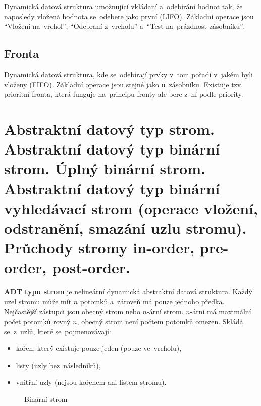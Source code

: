 Dynamická datová struktura umožnující vkládaní a~odebírání hodnot tak, že naposledy vložená hodnota se~odebere jako první (LIFO). Základní operace jsou \enquote{Vložení na~vrchol}, \enquote{Odebraní z~vrcholu} a~\enquote{Test na~prázdnost zásobníku}.

\subsection{Fronta}

Dynamická datová struktura, kde se~odebírají prvky v~tom pořadí v~jakém byli vloženy (FIFO). Základní operace jsou stejné jako u~zásobníku. Existuje tzv. prioritní fronta, která funguje na~principu fronty ale bere z~ní podle priority.

\clearpage
\section{Abstraktní datový typ strom. Abstraktní datový typ binární strom. Úplný binární strom. Abstraktní datový typ binární vyhledávací strom (operace vložení, odstranění, smazání uzlu stromu). Průchody stromy in-order, pre-order, post-order.}

\textbf{ADT typu strom} je nelineární dynamická abstraktní datová struktura. Každý uzel stromu může mít \( n \) potomků a~zároveň má pouze jednoho předka. Nejčastější zástupci jsou obecný strom nebo \( n \)-ární strom. \( n \)-ární má maximální počet potomků rovný \( n \), obecný strom není počtem potomků omezen. Skládá se~z~uzlů, které se~pojmenovávají:

\begin{itemize}
	\item kořen, který existuje pouze jeden (pouze ve~vrcholu),
	\item listy (uzly bez~následníků),
	\item vnitřní uzly (nejsou kořenem ani listem stromu).
\end{itemize}

\begin{figure}[ht]
	\centering
	\caption{Binární strom}
\end{figure}

